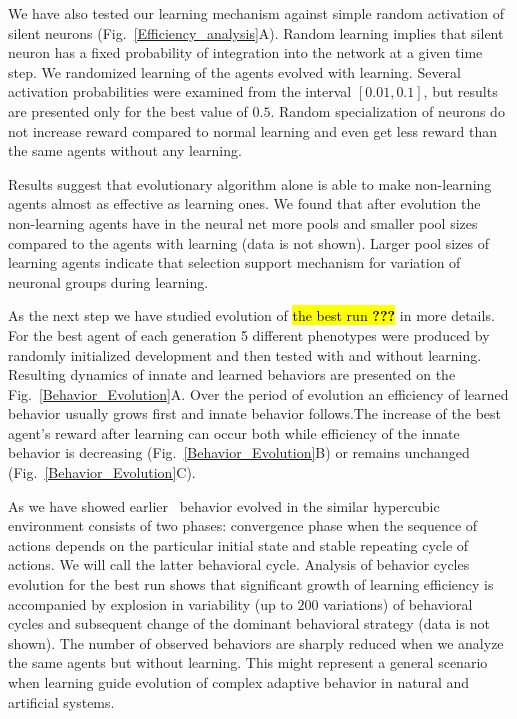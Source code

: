 \documentclass[letterpaper]{article}
\begin{document}
We have also tested our learning mechanism against simple random activation of silent neurons (Fig.~\ref{Efficiency_analysis}A). Random learning implies that silent neuron has a fixed probability of integration into the network at a given time step. We randomized learning of the agents evolved with learning. Several activation probabilities were examined from the interval $\left[0.01,0.1\right]$, but results are presented only for the best value of $0.5$. Random specialization of neurons do not increase reward compared to normal learning  and even get less reward than the same agents without any learning.

Results suggest that evolutionary algorithm alone is able to make non-learning agents almost as effective as learning ones. We found that after evolution the non-learning agents have in the neural net more pools and smaller pool sizes compared to the agents with learning (data is not shown). Larger pool sizes of learning agents indicate that selection support mechanism for variation of neuronal groups during learning. 

As the next step we have studied evolution of \hl{the best run \textbf{???}} in more details.
For the best agent of each generation 5 different phenotypes were produced by randomly initialized development and then tested with and without learning. Resulting dynamics of innate and learned behaviors are presented on the Fig.~\ref{Behavior_Evolution}A. Over the period of evolution an efficiency of learned behavior usually grows first and innate behavior follows.The increase of the best agent's reward after learning can occur both while efficiency of the innate behavior is decreasing (Fig.~\ref{Behavior_Evolution}B) or remains unchanged (Fig.~\ref{Behavior_Evolution}C). 

As we have showed earlier~\citep{LakhmanBurtsev2013} behavior evolved in the similar hypercubic environment consists of two phases: convergence phase when the sequence of actions depends on the particular initial state and stable repeating cycle of actions. We will call the latter behavioral cycle. Analysis of behavior cycles evolution for the best run shows that significant growth of learning efficiency is accompanied by explosion in variability (up to $200$ variations) of behavioral cycles and subsequent change of the dominant behavioral strategy (data is not shown). The number of observed behaviors are sharply reduced when we analyze the same agents but without learning. This might represent a general scenario when learning guide evolution of complex adaptive behavior in natural and artificial systems. 
\end{document}
